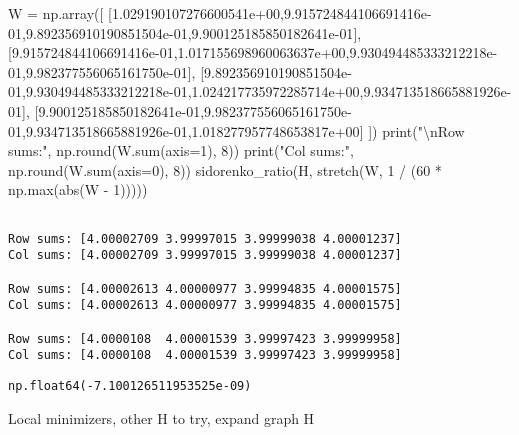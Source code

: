 \documentclass[
  letterpaper,
  DIV=11,
  numbers=noendperiod]{scrartcl}
\newenvironment{Shaded}{\begin{snugshade}}{\end{snugshade}}
\newcommand{\BuiltInTok}[1]{\textcolor[rgb]{0.00,0.23,0.31}{#1}}
\newcommand{\CharTok}[1]{\textcolor[rgb]{0.13,0.47,0.30}{#1}}
\newcommand{\DecValTok}[1]{\textcolor[rgb]{0.68,0.00,0.00}{#1}}
\newcommand{\FloatTok}[1]{\textcolor[rgb]{0.68,0.00,0.00}{#1}}
\newcommand{\NormalTok}[1]{\textcolor[rgb]{0.00,0.23,0.31}{#1}}
\newcommand{\OperatorTok}[1]{\textcolor[rgb]{0.37,0.37,0.37}{#1}}
\newcommand{\StringTok}[1]{\textcolor[rgb]{0.13,0.47,0.30}{#1}}
\begin{document}
\begin{Shaded}
\begin{Highlighting}[]
\NormalTok{W }\OperatorTok{=}\NormalTok{ np.array([}
\NormalTok{  [}\FloatTok{1.029190107276600541e+00}\NormalTok{,}\FloatTok{9.915724844106691416e{-}01}\NormalTok{,}\FloatTok{9.892356910190851504e{-}01}\NormalTok{,}\FloatTok{9.900125185850182641e{-}01}\NormalTok{],}
\NormalTok{[}\FloatTok{9.915724844106691416e{-}01}\NormalTok{,}\FloatTok{1.017155698960063637e+00}\NormalTok{,}\FloatTok{9.930494485333212218e{-}01}\NormalTok{,}\FloatTok{9.982377556065161750e{-}01}\NormalTok{],}
\NormalTok{[}\FloatTok{9.892356910190851504e{-}01}\NormalTok{,}\FloatTok{9.930494485333212218e{-}01}\NormalTok{,}\FloatTok{1.024217735972285714e+00}\NormalTok{,}\FloatTok{9.934713518665881926e{-}01}\NormalTok{],}
\NormalTok{[}\FloatTok{9.900125185850182641e{-}01}\NormalTok{,}\FloatTok{9.982377556065161750e{-}01}\NormalTok{,}\FloatTok{9.934713518665881926e{-}01}\NormalTok{,}\FloatTok{1.018277957748653817e+00}\NormalTok{]}
\NormalTok{])}
\BuiltInTok{print}\NormalTok{(}\StringTok{"}\CharTok{\textbackslash{}n}\StringTok{Row sums:"}\NormalTok{, np.}\BuiltInTok{round}\NormalTok{(W.}\BuiltInTok{sum}\NormalTok{(axis}\OperatorTok{=}\DecValTok{1}\NormalTok{), }\DecValTok{8}\NormalTok{))}
\BuiltInTok{print}\NormalTok{(}\StringTok{"Col sums:"}\NormalTok{, np.}\BuiltInTok{round}\NormalTok{(W.}\BuiltInTok{sum}\NormalTok{(axis}\OperatorTok{=}\DecValTok{0}\NormalTok{), }\DecValTok{8}\NormalTok{))}
\NormalTok{sidorenko\_ratio(H, stretch(W, }\DecValTok{1} \OperatorTok{/}\NormalTok{ (}\DecValTok{60} \OperatorTok{*}\NormalTok{ np.}\BuiltInTok{max}\NormalTok{(}\BuiltInTok{abs}\NormalTok{(W }\OperatorTok{{-}} \DecValTok{1}\NormalTok{)))))}
\end{Highlighting}
\end{Shaded}

\begin{verbatim}

Row sums: [4.00002709 3.99997015 3.99999038 4.00001237]
Col sums: [4.00002709 3.99997015 3.99999038 4.00001237]

Row sums: [4.00002613 4.00000977 3.99994835 4.00001575]
Col sums: [4.00002613 4.00000977 3.99994835 4.00001575]

Row sums: [4.0000108  4.00001539 3.99997423 3.99999958]
Col sums: [4.0000108  4.00001539 3.99997423 3.99999958]
\end{verbatim}

\begin{verbatim}
np.float64(-7.100126511953525e-09)
\end{verbatim}

Local minimizers, other H to try, expand graph H
\end{document}
